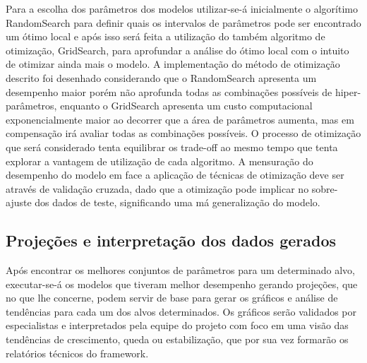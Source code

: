 Para a escolha dos parâmetros dos modelos utilizar-se-á inicialmente o algorítimo RandomSearch para definir quais os intervalos de parâmetros pode ser encontrado um ótimo local e após isso será feita a utilização do também algoritmo de otimização, GridSearch, para aprofundar a análise do ótimo local com o intuito de otimizar ainda mais o modelo. A implementação do método de otimização descrito foi desenhado considerando que o RandomSearch apresenta um desempenho maior porém não aprofunda todas as combinações possíveis de hiper-parâmetros, enquanto o GridSearch apresenta um custo computacional exponencialmente maior ao decorrer que a área de parâmetros aumenta, mas em compensação irá avaliar todas as combinações possíveis. O processo de otimização que será considerado tenta equilibrar os trade-off ao mesmo tempo que tenta explorar a vantagem de utilização de cada algoritmo. A mensuração do desempenho do modelo em face a aplicação de técnicas de otimização deve ser através de validação cruzada, dado que a otimização pode implicar no sobre-ajuste dos dados de teste, significando uma má generalização do modelo.

\subsection{Projeções e interpretação dos dados gerados}

Após encontrar os melhores conjuntos de parâmetros para um determinado alvo, executar-se-á os modelos que tiveram melhor desempenho gerando
projeções, que no que lhe concerne, podem servir de base para gerar os gráficos e análise de tendências para cada um dos alvos determinados.
Os gráficos serão validados por especialistas e interpretados pela equipe do projeto com foco em uma visão das tendências de crescimento, queda ou
estabilização, que por sua vez formarão os relatórios técnicos do framework.